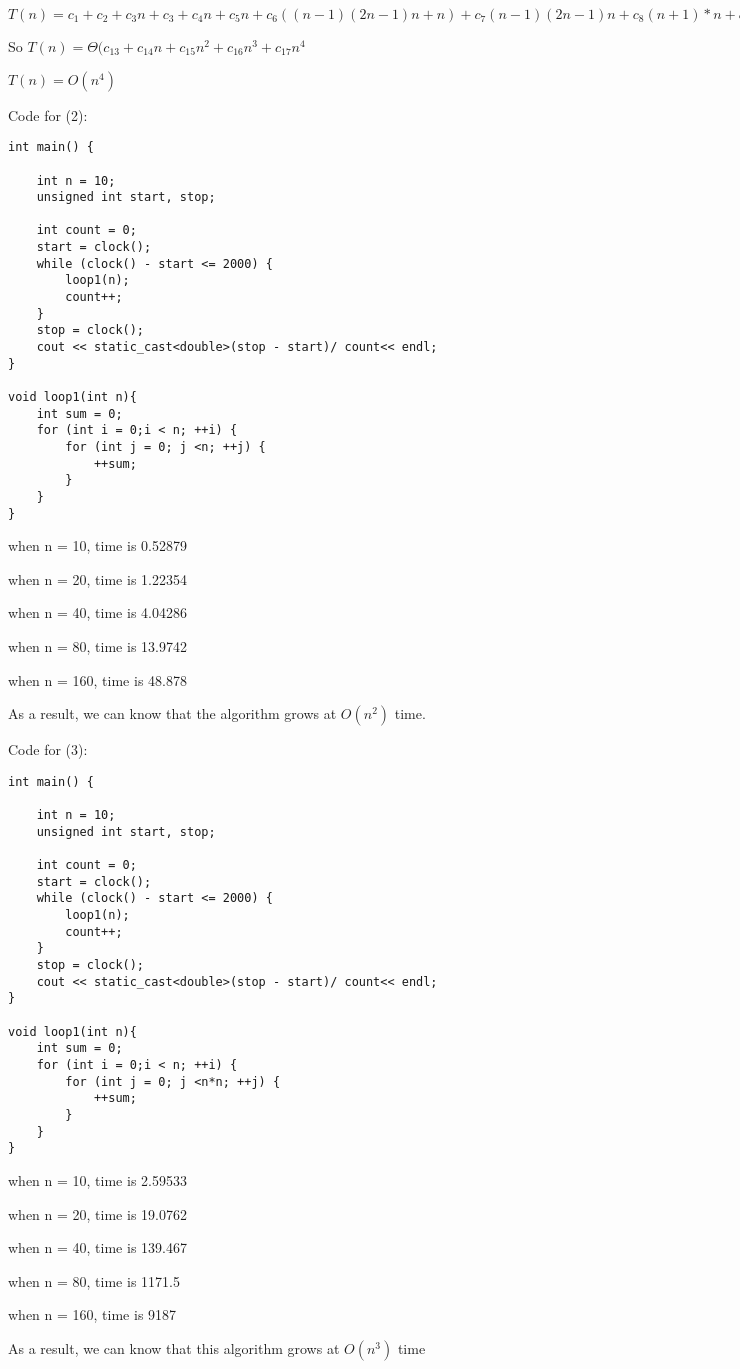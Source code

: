 \documentclass[12pt]{article}
\begin{document}
\begin{enumerate}
$T(n) = c_1 + c_2 + c_3n + c_3 +c_4n + c_5n + c_6((n-1)(2n-1)n+n)+ c_7(n-1)(2n-1)n+c_8(n+1)*n+c_9(n+1)*n+c_{10}(n-1)(2n-1)n*n+c_{11}((n-1)(2n-1)n*n -n)+c_{12}((n-1)(2n-1)n*n -n)$

So $T(n) = \Theta(c_{13} + c_{14}n + c_{15}n^2 + c_{16} n^3 + c_{17}n^4$

$T(n) = O(n^4)$


Code for (2):
\begin{verbatim}
int main() {

    int n = 10;
    unsigned int start, stop;

    int count = 0;
    start = clock();
    while (clock() - start <= 2000) {
        loop1(n);
        count++;
    }
    stop = clock();
    cout << static_cast<double>(stop - start)/ count<< endl;
}

void loop1(int n){
    int sum = 0;
    for (int i = 0;i < n; ++i) {
        for (int j = 0; j <n; ++j) {
            ++sum;
        }
    }
}
\end{verbatim}
when n = 10, time is 0.52879

when n = 20, time is 1.22354

when n = 40, time is 4.04286

when n = 80, time is 13.9742

when n = 160, time is 48.878

As a result, we can know that the algorithm grows at $O(n^2)$ time.


Code for (3):
\begin{verbatim}
int main() {

    int n = 10;
    unsigned int start, stop;

    int count = 0;
    start = clock();
    while (clock() - start <= 2000) {
        loop1(n);
        count++;
    }
    stop = clock();
    cout << static_cast<double>(stop - start)/ count<< endl;
}

void loop1(int n){
    int sum = 0;
    for (int i = 0;i < n; ++i) {
        for (int j = 0; j <n*n; ++j) {
            ++sum;
        }
    }
}
\end{verbatim}
when n = 10, time is 2.59533

when n = 20, time is 19.0762

when n = 40, time is 139.467

when n = 80, time is 1171.5

when n = 160, time is 9187

As a result, we can know that this algorithm grows at $O(n^3)$ time



\end{enumerate}
\end{document}
